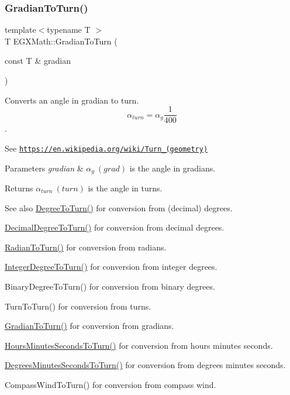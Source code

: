 \subsubsection{\texorpdfstring{Gradian\+To\+Turn()}{GradianToTurn()}}
{\footnotesize\ttfamily template$<$typename T $>$ \\
T E\+G\+X\+Math\+::\+Gradian\+To\+Turn (\begin{DoxyParamCaption}\item[{const T \&}]{gradian }\end{DoxyParamCaption})}



Converts an angle in gradian to turn. \[\alpha_{turn}=\alpha_{g}\frac{1}{400}\]. 

See \href{https://en.wikipedia.org/wiki/Turn_(geometry)}{\tt https\+://en.\+wikipedia.\+org/wiki/\+Turn\+\_\+(geometry)} 
\begin{DoxyParams}{Parameters}
{\em gradian} & $\alpha_{g}\ (grad)$ is the angle in gradians. \\
\hline
\end{DoxyParams}
\begin{DoxyReturn}{Returns}
$\alpha_{turn}\ (turn)$ is the angle in turns. 
\end{DoxyReturn}
\begin{DoxySeeAlso}{See also}
\mbox{\hyperlink{group___e_g_x_math-_angle_conversions-_degree_gafb4ce930493a7d6202ede3ee1630ef5d}{Degree\+To\+Turn()}} for conversion from (decimal) degrees. 

\mbox{\hyperlink{group___e_g_x_math-_angle_conversions-_decimal_degree_ga396a13c10acdef5026c12f3217b142c1}{Decimal\+Degree\+To\+Turn()}} for conversion from decimal degrees. 

\mbox{\hyperlink{group___e_g_x_math-_angle_conversions-_radian_ga8492d6d2f6467c619b65e5fb75a9ae04}{Radian\+To\+Turn()}} for conversion from radians. 

\mbox{\hyperlink{group___e_g_x_math-_angle_conversions-_integer_degree_ga06ddbdada5a3978105c855d4aae735ae}{Integer\+Degree\+To\+Turn()}} for conversion from integer degrees. 

Binary\+Degree\+To\+Turn() for conversion from binary degrees. 

Turn\+To\+Turn() for conversion from turns. 

\mbox{\hyperlink{group___e_g_x_math-_angle_conversions-_gradian_ga11b42138910d26474f47c0a2043911c9}{Gradian\+To\+Turn()}} for conversion from gradians. 

\mbox{\hyperlink{group___e_g_x_math-_angle_conversions-_hours_minutes_seconds_ga68050282994968cd6f80a396f6a539ae}{Hours\+Minutes\+Seconds\+To\+Turn()}} for conversion from hours minutes seconds. 

\mbox{\hyperlink{group___e_g_x_math-_angle_conversions-_degrees_minutes_seconds_ga1e6b1b889f6914942b12623934341fc6}{Degrees\+Minutes\+Seconds\+To\+Turn()}} for conversion from degrees minutes seconds. 

Compass\+Wind\+To\+Turn() for conversion from compass wind. 
\end{DoxySeeAlso}
